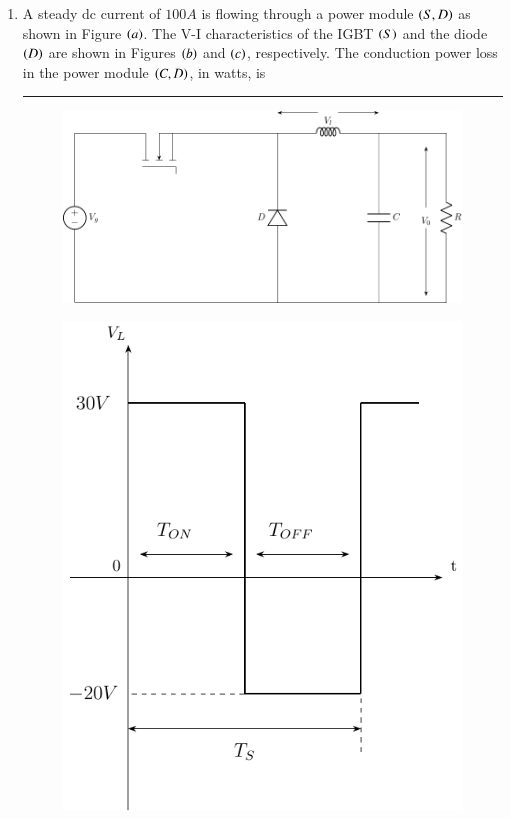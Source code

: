 \documentclass[journal]{IEEEtran}
\begin{document}
\begin{enumerate}
\item A steady dc current of $100 A$ is flowing through a power module $\left(S, D\right)$ as shown in Figure $\left(a\right)$. The V-I characteristics of the IGBT $\left(S\right)$ and the diode $\left(D\right)$ are shown in Figures $\left(b\right)$ and $\left(c\right)$, respectively. The conduction power loss in the power module $\left(C,D\right)$, in watts, is \rule{2cm}{0.2pt}
	\begin{multicols}{2}
\begin{figure}[H]
			\centering
			\includegraphics[scale=0.4]{figs/q22-1.png}
			\caption{}
			\label{figure(a)}
		\end{figure}
		\columnbreak
	\begin{figure}[H]
			\centering
			\includegraphics[scale=0.5]{figs/q22-2.png}

\end{figure}
\end{multicols}
\end{enumerate}
\end{document}
